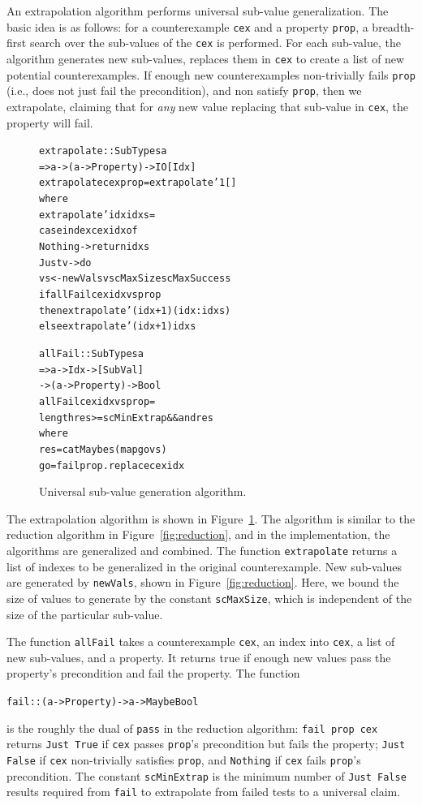 \documentclass[10pt]{sigplanconf}
\newenvironment{code}{\begin{alltt}}{\end{alltt}}
\newcommand{\ttp}[1]{\texttt{#1}}
\begin{document}
An extrapolation algorithm performs universal sub-value generalization.  The
basic idea is as follows: for a counterexample \ttp{cex} and a property
\ttp{prop}, a breadth-first search over the sub-values of the \ttp{cex} is
performed.  For each sub-value, the algorithm generates new sub-values, replaces
them in \ttp{cex} to create a list of new potential counterexamples.  If enough
new counterexamples non-trivially fails \ttp{prop} (i.e., does not just fail the
precondition), and non satisfy \ttp{prop}, then we extrapolate, claiming that
for \emph{any} new value replacing that sub-value in \ttp{cex}, the property
will fail.

\begin{figure}
  \begin{code}
extrapolate :: SubTypes a
       => a -> (a -> Property) -> IO [Idx]
extrapolate cex prop = extrapolate' 1 []
  where
  extrapolate' idx idxs =
    case index cex idx of
      Nothing -> return idxs
      Just v  -> do
        vs <- newVals v scMaxSize scMaxSuccess
        if allFail cex idx vs prop
          then extrapolate' (idx+1) (idx:idxs)
          else extrapolate' (idx+1) idxs

allFail :: SubTypes a
     => a -> Idx -> [SubVal]
     -> (a -> Property) -> Bool
allFail cex idx vs prop =
  length res >= scMinExtrap && and res
  where
  res  = catMaybes (map go vs)
  go   = fail prop . replace cex idx
  \end{code}
  \caption{Universal sub-value generation algorithm.}
  \label{fig:universal}
\end{figure}

The extrapolation algorithm is shown in Figure~\ref{fig:universal}.  The
algorithm is similar to the reduction algorithm in Figure~\ref{fig:reduction},
and in the implementation, the algorithms are generalized and combined.  The
function \ttp{extrapolate} returns a list of indexes to be generalized in the
original counterexample.  New sub-values are generated by \ttp{newVals}, shown
in Figure~\ref{fig:reduction}.  Here, we bound the size of values to generate by
the constant \ttp{scMaxSize}, which is independent of the size of the particular
sub-value.

The function \ttp{allFail} takes a counterexample \ttp{cex}, an index into
\ttp{cex}, a list of new sub-values, and a property.  It returns true if enough
new values pass the property's precondition and fail the property.  The function
%
\begin{code}
fail :: (a -> Property) -> a -> Maybe Bool
\end{code}
%
\noindent
is the roughly the dual of \ttp{pass} in the reduction algorithm: \ttp{fail prop
  cex} returns \ttp{Just True} if \ttp{cex} passes \ttp{prop}'s precondition but
fails the property; \ttp{Just False} if \ttp{cex} non-trivially satisfies
\ttp{prop}, and \ttp{Nothing} if \ttp{cex} fails \ttp{prop}'s precondition.  The
constant \ttp{scMinExtrap} is the minimum number of \ttp{Just False} results
required from \ttp{fail} to extrapolate from failed tests to a universal claim.
\end{document}
